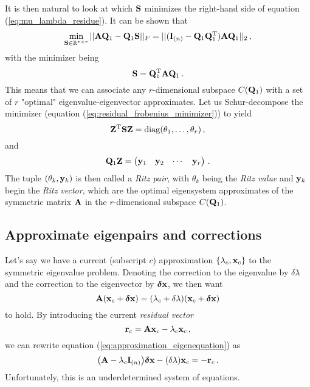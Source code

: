        It is then natural to look at which $\vb{S}$ minimizes the right-hand side of equation (\ref{eq:mu_lambda_residue}). It can be shown that
        \begin{equation}
            \min_{\vb{S} \in \mathbb{R}^{r \times r}} || \vb{A}\vb{Q}_1 - \vb{Q}_1 \vb{S} ||_F = || (\vb{I}_{(n)} - \vb{Q}_1 \vb{Q}_1^\text{T}) \vb{A}\vb{Q}_1 ||_2 \thinspace ,
        \end{equation}
        with the minimizer being
        \begin{equation} \label{eq:residual_frobenius_minimizer}
            \vb{S} = \vb{Q}_1^\text{T} \vb{A} \vb{Q}_1 \thinspace .
        \end{equation}
        This means that we can associate any $r$-dimensional subspace $C(\vb{Q}_1)$ with a set of $r$ "optimal" eigenvalue-eigenvector approximates. Let us Schur-decompose the minimizer (equation (\ref{eq:residual_frobenius_minimizer})) to yield
        \begin{equation}
            \vb{Z}^\text{T} \vb{S} \vb{Z} = \operatorname{diag}(\theta_1, \dots, \theta_r) \thinspace ,
        \end{equation}
        and
        \begin{equation}
            \vb{Q}_1 \vb{Z} = \begin{pmatrix} \vb{y}_1 & \vb{y}_2 & \cdots & \vb{y}_r \end{pmatrix} \thinspace .
        \end{equation}
        The tuple $(\theta_k, \vb{y}_k)$ is then called a \emph{Ritz pair}, with $\theta_k$ being the \emph{Ritz value} and $\vb{y}_k$ begin the \emph{Ritz vector}, which are the optimal eigensystem approximates of the symmetric matrix $\vb{A}$ in the $r$-dimensional subspace $C(\vb{Q}_1)$.

    \subsection{Approximate eigenpairs and corrections}
        Let's say we have a current (subscript $c$) approximation $\qty{\lambda_c, \vb{x}_c}$ to the symmetric eigenvalue problem. Denoting the correction to the eigenvalue by $\delta\lambda$ and the correction to the eigenvector by $\boldsymbol{\delta} \vb{x}$, we then want
        \begin{equation} \label{eq:approximation_eigenequation}
            \vb{A} (\vb{x}_c + \boldsymbol{\delta} \vb{x}) = (\lambda_c + \delta\lambda)(\vb{x}_c + \boldsymbol{\delta} \vb{x})
        \end{equation}
        to hold. By introducing the current \emph{residual vector}
        \begin{equation}
            \vb{r}_c = \vb{A} \vb{x}_c - \lambda_c \vb{x}_c \thinspace ,
        \end{equation}
        we can rewrite equation (\ref{eq:approximation_eigenequation}) as
        \begin{equation} \label{eq:residual_vector_equation}
            \qty(\vb{A} - \lambda_c \vb{I}_{(n)}) \boldsymbol{\delta} \vb{x} - (\delta\lambda) \vb{x}_c = - \vb{r}_c \thinspace .
        \end{equation}
        Unfortunately, this is an underdetermined system of equations.

